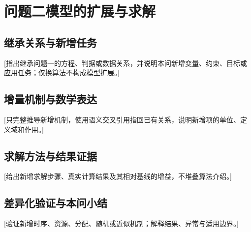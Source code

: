 \section{问题二模型的扩展与求解}
\subsection{继承关系与新增任务}
[指出继承问题一的方程、判据或数据关系，并说明本问新增变量、约束、目标或应用任务；仅换算法不构成模型扩展。]
\subsection{增量机制与数学表达}
[只完整推导新增机制，使用语义交叉引用指回已有关系，说明新增项的单位、定义域和作用。]
\subsection{求解方法与结果证据}
[给出新增求解步骤、真实计算结果及其相对基线的增益，不堆叠算法介绍。]
\subsection{差异化验证与本问小结}
[验证新增时序、资源、分配、随机或近似机制；解释结果、异常与适用边界。]
